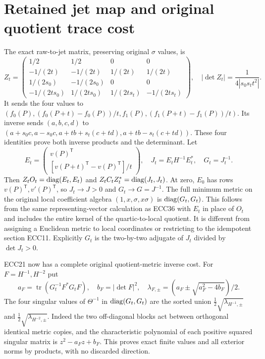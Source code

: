 \documentclass[11pt]{article}
\newcommand{\Tr}{\operatorname{tr}}\newcommand{\Res}{\operatorname{Res}}
\begin{document}
\section{Retained jet map and original quotient trace cost}
The exact raw-to-jet matrix, preserving original $\sigma$ values, is
\begin{equation}
 Z_t=\begin{pmatrix}
 1/2&1/2&0&0\\-1/(2t)&-1/(2t)&1/(2t)&1/(2t)\\
 1/(2s_0)&-1/(2s_0)&0&0\\
 -1/(2ts_0)&1/(2ts_0)&1/(2ts_t)&-1/(2ts_t)
 \end{pmatrix},\quad
 |\det Z_t|=\frac1{4|s_0s_tt^2|}.
 \tag{ECC38}
\end{equation}
It sends the four values to
$(f_0(P),(f_0(P+t)-f_0(P))/t,f_1(P),(f_1(P+t)-f_1(P))/t)$.
Its inverse sends $(a,b,c,d)$ to
$(a+s_0c,a-s_0c,a+tb+s_t(c+td),a+tb-s_t(c+td))$.
These four identities prove both inverse products and the determinant.
Let
\begin{equation}
 E_t=\begin{pmatrix}v(P)^{\mathsf T}\\
 [v(P+t)^{\mathsf T}-v(P)^{\mathsf T}]/t\end{pmatrix},\quad
 J_t=E_tH^{-1}E_t^*,\quad G_t=J_t^{-1}.
 \tag{ECC39}
\end{equation}
Then $Z_tO_t=\operatorname{diag}(E_t,E_t)$ and
$Z_tC_tZ_t^*=\operatorname{diag}(J_t,J_t)$. At zero, $E_0$ has rows
$v(P)^{\mathsf T},v'(P)^{\mathsf T}$, so $J_t\to J>0$ and
$G_t\to G=J^{-1}$. The full minimum metric on the original local
coefficient algebra $(1,x,\sigma,x\sigma)$ is
$\operatorname{diag}(G_t,G_t)$. This follows from the same representing-vector
calculation as ECC36 with $E_t$ in place of $O_t$ and includes the entire
kernel of the quartic-to-local quotient. It is different from assigning
a Euclidean metric to local coordinates or restricting to the idempotent
section ECC11. Explicitly $G_t$ is the two-by-two adjugate of $J_t$
divided by $\det J_t>0$.

ECC21 now has a complete original quotient-metric inverse cost. For
$F=H^{-1},H^{-2}$ put
\begin{equation}
 a_F=\Tr(G_t^{-1}F^*G_tF),\quad b_F=|\det F|^2,\quad
 \lambda_{F,\pm}=(a_F\pm\sqrt{a_F^2-4b_F})/2.
 \tag{ECC40}
\end{equation}
The four singular values of $\Theta^{-1}$ in
$\operatorname{diag}(G_t,G_t)$ are the sorted union
$\tfrac12\sqrt{\lambda_{H^{-1},\pm}}$ and
$\tfrac12\sqrt{\lambda_{H^{-2},\pm}}$. Indeed the two off-diagonal
blocks act between orthogonal identical metric copies, and the
characteristic polynomial of each positive squared singular matrix is
$z^2-a_Fz+b_F$. This proves exact finite values and all exterior norms
by products, with no discarded direction.
\end{document}
